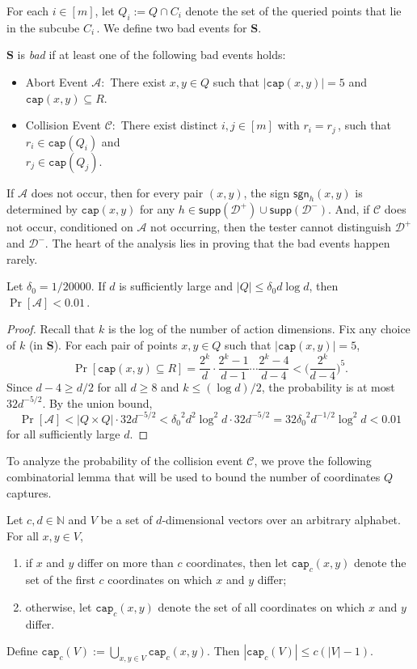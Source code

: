 \documentclass{toc}
\newcommand{\bS}{\ensuremath{\mathbf{S}}}
\newcommand{\cA}{\ensuremath{\mathcal{A}}}
\newcommand{\cC}{\ensuremath{\mathcal{C}}}
\newcommand{\Yes}{\ensuremath{\mathcal{D}^+}}
\newcommand{\No}{\ensuremath{\mathcal{D}^-}}
\newcommand{\lbconst}{\ensuremath{\delta_0}}
\newcommand{\capt}{\mathtt{cap}}
\newcommand{\sgn}{\mathsf{sgn}}
\newcommand{\supp}{\mathsf{supp}}
\begin{document}
For each $i \in [m]$, let $Q_i := Q \cap C_i$ denote the set of the queried points that lie in the subcube $C_i$\,. %
We define two bad events for $\bS$.
\begin{definition}\label{def:bad}
$\bS$ is \emph{bad} if at least one of the following bad events holds:
\begin{itemize}
\item Abort Event $\cA$:\ There exist $x,y \in Q$
such that $|\capt(x,y)| = 5$ and $\capt(x,y) \subseteq R$.
\item Collision Event $\cC$:\ There exist distinct $i,j \in [m]$
with $r_i = r_j$\,, %
such that $r_i\in \capt(Q_i)$ and \\ $r_j\in \capt(Q_j)$.
%
\end{itemize}
\end{definition}

If $\cA$ does not occur, then
for every pair $(x,y)$, the sign $\sgn_h(x,y)$ is determined by $\capt(x,y)$ for any $h\in \supp(\Yes)\cup \supp(\No)$.
And, if $\cC$ does not occur, conditioned on $\cA$ not occurring, then the tester cannot distinguish $\Yes$ and $\No.$
The heart of the analysis lies in proving that the bad events happen rarely.
%
%
%
%
%
%

\begin{lemma}\label{lem:abort}
Let $\lbconst = {1}/{20000}$. If $d$ is sufficiently large and $|Q|\leq \lbconst d\log d$, then $\Pr[\cA] < 0.01$\,. %
\end{lemma}

\begin{proof}
Recall that $k$ is the log of the number of action dimensions.
Fix any choice of $k$ (in $\bS$).
For each pair of points $x,y \in Q$ such that $|\capt(x,y)| = 5$,
\[\Pr[\capt(x,y) \subseteq R] = \frac{2^k}{d} \cdot \frac{2^k-1}{d-1} \cdots \frac{2^k-4}{d-4} < \Big(\frac{2^k}{d-4}\Big)^5.\]
Since $d-4 \geq d/2$ for all $d \geq 8$
and $k \leq (\log d)/2$, the probability is at most $32d^{-5/2}$.
By the union bound, $$\Pr[\cA] < |Q \times Q| \cdot 32d^{-5/2} < \lbconst^2 d^2 \log^2 d \cdot 32 d^{-5/2}  = 32 \lbconst^2 d^{-1/2} \log^2 d < 0.01$$ for all sufficiently large $d$.
\end{proof}

To analyze the probability of the collision event $\cC$, we prove the following combinatorial lemma that will be used to bound the number of coordinates $Q$ captures.

\begin{lemma}\label{lem:comb}
Let $c,d \in \mathbb{N}$ and $V$ be a set of $d$-dimensional vectors over an arbitrary alphabet. For all $x,y \in V$,
\begin{enumerate}
\item  if $x$ and $y$ differ on more than $c$ coordinates, then let $\capt_c(x,y)$ denote the set of the first $c$ coordinates on which $x$ and $y$ differ;
\item otherwise, let $\capt_c(x,y)$ denote the set of all coordinates
on which $x$ and $y$ differ.
\end{enumerate}
Define $\capt_c(V) := \bigcup_{x,y \in V} \capt_c(x,y)$.
Then $|\capt_c(V)| \leq c(|V|-1)$.
\end{lemma}
\end{document}
